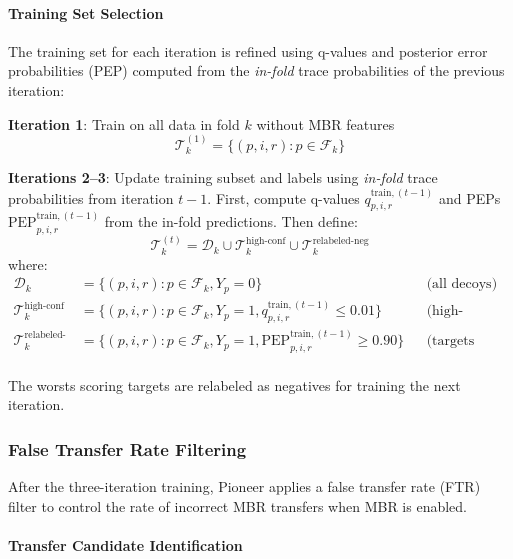 \documentclass[pdflatex,sn-nature]{sn-jnl}
\begin{document}
\paragraph{Training Set Selection}\label{para:training-set-selection} The training set for each iteration is refined using q-values and posterior error probabilities (PEP) computed from the \emph{in-fold} trace probabilities of the previous iteration:

\textbf{Iteration 1}: Train on all data in fold $k$ without MBR features
\begin{equation}
  \mathcal{T}_{k}^{(1)} = \{(p,i,r) : p \in \mathcal{F}_{k}\}
\end{equation}

\textbf{Iterations 2--3}: Update training subset and labels using \emph{in-fold} trace probabilities from iteration $t-1$. First, compute q-values $q_{p,i,r}^{\text{train},(t-1)}$ and PEPs $\text{PEP}_{p,i,r}^{\text{train},(t-1)}$ from the in-fold predictions. Then define:
\begin{equation}
  \mathcal{T}_{k}^{(t)} = \mathcal{D}_k \cup \mathcal{T}_k^{\text{high-conf}} \cup \mathcal{T}_k^{\text{relabeled-neg}}
\end{equation}
where:
\begin{align}
  \mathcal{D}_k &= \{(p,i,r) : p \in \mathcal{F}_{k}, Y_p = 0\} && \text{(all decoys)} \\
  \mathcal{T}_k^{\text{high-conf}} &= \{(p,i,r) : p \in \mathcal{F}_{k}, Y_p = 1, q_{p,i,r}^{\text{train},(t-1)} \leq 0.01\} && \text{(high-confidence targets)} \\
  \mathcal{T}_k^{\text{relabeled-neg}} &= \{(p,i,r) : p \in \mathcal{F}_{k}, Y_p = 1, \text{PEP}_{p,i,r}^{\text{train},(t-1)} \geq 0.90\} && \text{(targets relabeled as negative)} \\
\end{align}

The worsts scoring targets are relabeled as negatives for training the next iteration.

\subsubsection{False Transfer Rate Filtering}\label{subsubsec:false-transfer-rate-filtering}

After the three-iteration training, Pioneer applies a false transfer rate (FTR) filter to control the rate of incorrect MBR transfers when MBR is enabled.


\paragraph{Transfer Candidate Identification}\label{para:transfer-candidate-identification} 
\end{document}

